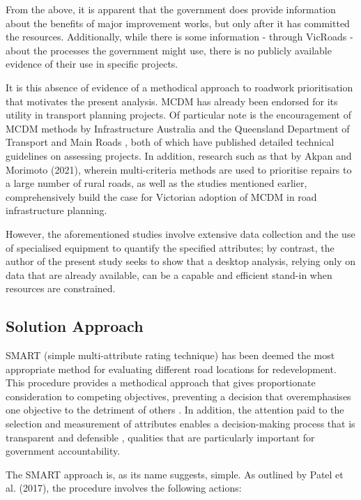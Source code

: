\documentclass[11pt, a4paper]{article}
\begin{document}
    From the above, it is apparent that the government does provide information about the benefits of major improvement works, but only after it has committed the resources. Additionally, while there is some information - through VicRoads - about the processes the government might use, there is no publicly available evidence of their use in specific projects.
    
    It is this absence of evidence of a methodical approach to roadwork prioritisation that motivates the present analysis. MCDM has already been endorsed for its utility in transport planning projects. Of particular note is the encouragement of MCDM methods by Infrastructure Australia and the Queensland Department of Transport and Main Roads \parencite{a10}, both of which have published detailed technical guidelines on assessing projects. In addition, research such as that by Akpan and Morimoto (2021), wherein multi-criteria methods are used to prioritise repairs to a large number of rural roads, as well as the studies mentioned earlier, comprehensively build the case for Victorian adoption of MCDM in road infrastructure planning.
    
    However, the aforementioned studies involve extensive data collection and the use of specialised equipment to quantify the specified attributes; by contrast, the author of the present study seeks to show that a desktop analysis, relying only on data that are already available, can be a capable and efficient stand-in when resources are constrained.
    
    \subsection{Solution Approach}

    SMART (simple multi-attribute rating technique) has been deemed the most appropriate method for evaluating different road locations for redevelopment. This procedure provides a methodical approach that gives proportionate consideration to competing objectives, preventing a decision that overemphasises one objective to the detriment of others \parencite{a13}. In addition, the attention paid to the selection and measurement of attributes enables a decision-making process that is transparent and defensible \parencite{a13}, qualities that are particularly important for government accountability.

    The SMART approach is, as its name suggests, simple. As outlined by Patel et al. (2017), the procedure involves the following actions:
\end{document}
